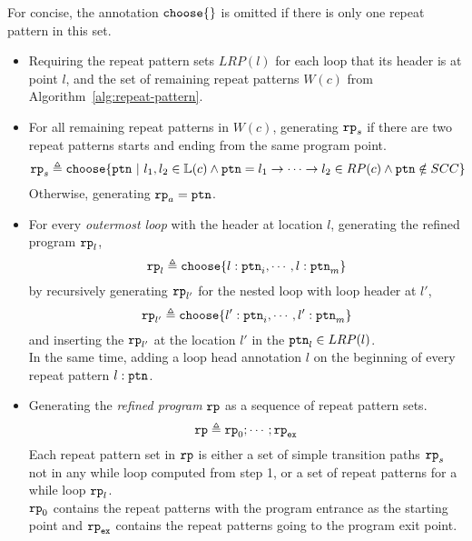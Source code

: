%
For concise, the annotation $\rpchoose{}$ is omitted if there is only one repeat pattern in this set.
\begin{itemize}
\item Requiring the repeat pattern sets $LRP(l)$ for each loop
that its header is at point $l$,
and the set of remaining repeat patterns $W(c)$ from Algorithm~\ref{alg:repeat-pattern}.
% 
\item For all remaining repeat patterns in $W(c)$, 
generating $\mathtt{rp}_{s}$ if there
are two repeat patterns starts and ending from the same program point.
\[
  \rprog_{s} \triangleq 
  \rpchoose{
  \rpattern ~|~ l_1, l_2 \in \lvar(c) \land 
  \rpattern = l_1 \to \cdots \to l_2 \in RP(c) 
  \land  \rpattern \notin SCC
    }
\]
Otherwise, generating $\mathtt{rp}_{a} = \mathtt{ptn}$.
%
\item 
For every \emph{outermost loop} with the header at location $l$, 
generating the refined program $\mathtt{rp}_l$,
\[
  \rprog_l \triangleq 
  \rpchoose{
   l: \rpattern_{i}, \cdots, l: \rpattern_{m}
  }
\]
by 
recursively generating $\mathtt{rp}_{l'}$ for the nested loop with loop header at $l'$,
\[
  \rprog_{l'} \triangleq 
\rpchoose{
 l': \rpattern_{i}, \cdots, l': \rpattern_{m}
}
\]
and inserting the $\mathtt{rp}_{l'}$ at the location $l'$ in the $\mathtt{ptn}_l \in LRP(l)$.
\\
In the same time, adding a loop head annotation $l$ on the beginning of every repeat pattern $l: \mathtt{ptn}$.
\item
Generating the \emph{refined program} $\mathtt{rp}$ as a sequence of repeat pattern sets.
%
\[
\mathtt{rp} \triangleq \mathtt{rp}_0; \cdots; \mathtt{rp}_{\mathtt{ex}}
\]
%
Each repeat pattern set in $\mathtt{rp}$ is either a set of simple transition paths $\mathtt{rp}_{s}$ not in any while loop computed from step 1,
or a set of repeat patterns for a while loop $\mathtt{rp}_l$.
\\
$\mathtt{rp}_0$ contains the repeat patterns with the program entrance as the starting point
and $\mathtt{rp}_{\mathtt{ex}}$ contains the repeat patterns going to the program exit point.
%
\end{itemize}
%

